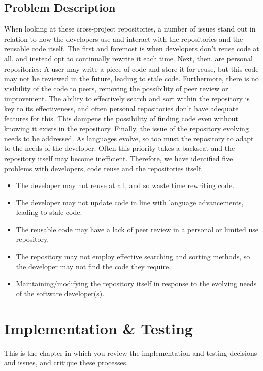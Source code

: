 \documentclass[11pt,openright,a4paper]{report}
\begin{document}
\section{Problem Description}
When looking at these cross-project repositories, a number of issues stand out in relation to how the developers use and interact with the repositories and the reusable code itself. The first and foremost is when developers don’t reuse code at all, and instead opt to continually rewrite it each time.
Next, then, are personal repositories: A user may write a piece of code and store it for reuse, but this code may not be reviewed in the future, leading to stale code. Furthermore, there is no visibility of the code to peers, removing the possibility of peer review or improvement.
The ability to effectively search and sort within the repository is key to its effectiveness, and often personal repositories don’t have adequate features for this. This dampens the possibility of finding code even without knowing it exists in the repository.
Finally, the issue of the repository evolving needs to be addressed. As languages evolve, so too must the repository to adapt to the needs of the developer. Often this priority takes a backseat and the repository itself may become inefficient. Therefore, we have identified five problems with developers, code reuse and the repositories itself.

\begin{itemize}
\item The developer may not reuse at all, and so waste time rewriting code.
\item The developer may not update code in line with language advancements, leading to stale code. 
\item The reusable code may have a lack of peer review in a personal or limited use repository.
\item The repository may not employ effective searching and sorting methods, so the developer may not find the code they require.
\item Maintaining/modifying the repository itself in response to the evolving needs of the software developer(s). 
\end{itemize}








\chapter{Implementation \& Testing}
This is the chapter in which you review the implementation and testing
decisions and issues, and critique these processes.
\end{document}
